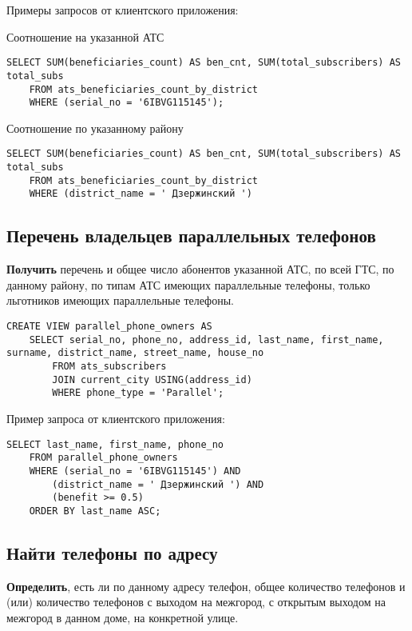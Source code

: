 \documentclass{report}
\begin{document}
Примеры запросов от клиентского приложения:

Соотношение на указанной АТС
\begin{lstlisting}
SELECT SUM(beneficiaries_count) AS ben_cnt, SUM(total_subscribers) AS total_subs
	FROM ats_beneficiaries_count_by_district
	WHERE (serial_no = '6IBVG115145');
\end{lstlisting}

Соотношение по указанному району
\begin{lstlisting}
SELECT SUM(beneficiaries_count) AS ben_cnt, SUM(total_subscribers) AS total_subs
	FROM ats_beneficiaries_count_by_district
	WHERE (district_name = ' Дзержинский ')
\end{lstlisting}

\subsection{Перечень владельцев параллельных телефонов}

\textbf{Получить} перечень и общее число абонентов указанной АТС, 
по всей ГТС, по данному району, по типам АТС имеющих параллельные телефоны, 
только льготников имеющих параллельные телефоны.

\begin{lstlisting}
CREATE VIEW parallel_phone_owners AS
    SELECT serial_no, phone_no, address_id, last_name, first_name, surname, district_name, street_name, house_no
        FROM ats_subscribers
        JOIN current_city USING(address_id)
        WHERE phone_type = 'Parallel';
\end{lstlisting}

Пример запроса от клиентского приложения:

\begin{lstlisting}
SELECT last_name, first_name, phone_no
	FROM parallel_phone_owners
	WHERE (serial_no = '6IBVG115145') AND
		(district_name = ' Дзержинский ') AND
		(benefit >= 0.5)
	ORDER BY last_name ASC;
\end{lstlisting}

\subsection{Найти телефоны по адресу}

\textbf{Определить}, есть ли по данному адресу телефон, общее 
количество телефонов и (или) количество телефонов с выходом на межгород, 
с открытым выходом на межгород в данном доме, на конкретной улице.
\end{document}
